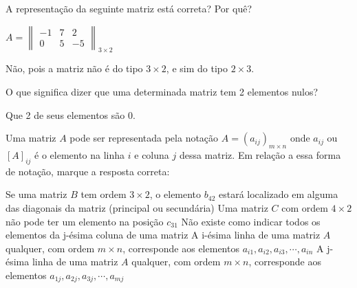 \documentclass[pdftex, brazil, 12pt, oneside, addpoints]{exam}
\newcommand{\vf}[1][{}]{%
  \fillin[#1][0.25in]%
}
\begin{document}
\begin{questions}

\question
A representação da seguinte matriz está correta? Por quê?

$A = \begin{Vmatrix}
  -1 & 7 & 2\\
  0 & 5 & -5\end{Vmatrix}_{3 \times 2}$
\begin{solutionorlines}[0.50in]
  Não, pois a matriz não é do tipo $3 \times 2$, e sim do tipo
  $2 \times 3$.
\end{solutionorlines}

\question
O que significa dizer que uma determinada matriz tem 2 elementos nulos?
\begin{solutionorlines}[0.50in]
  Que 2 de seus elementos são $0$.
\end{solutionorlines}

\question
Uma matriz $A$ pode ser representada pela notação $A = (a_{ij})_{m \times n}$
onde $a_{ij}$ ou $[A]_{ij}$ é o elemento na linha $i$ e coluna $j$ dessa
matriz. Em relação a essa forma de notação, marque a resposta correta:
\begin{checkboxes}
  \choice Se uma matriz $B$ tem ordem $3 \times 2$, o elemento $b_{42}$ estará
  localizado em alguma das diagonais da matriz (principal ou secundária)
  \choice Uma matriz $C$ com ordem $4 \times 2$ não pode ter um elemento
  na posição $c_{31}$
  \choice Não existe como indicar todos os elementos da j-ésima coluna de uma matriz
  \CorrectChoice A i-ésima linha de uma matriz $A$ qualquer, com ordem $m \times n$, corresponde aos
  elementos $a_{i1}, a_{i2}, a_{i3}, \cdots, a_{in}$
  \choice A j-ésima linha de uma matriz $A$ qualquer, com ordem $m \times n$, corresponde aos
  elementos $a_{1j}, a_{2j}, a_{3j}, \cdots, a_{mj}$
\end{checkboxes}


\end{questions}
\end{document}
